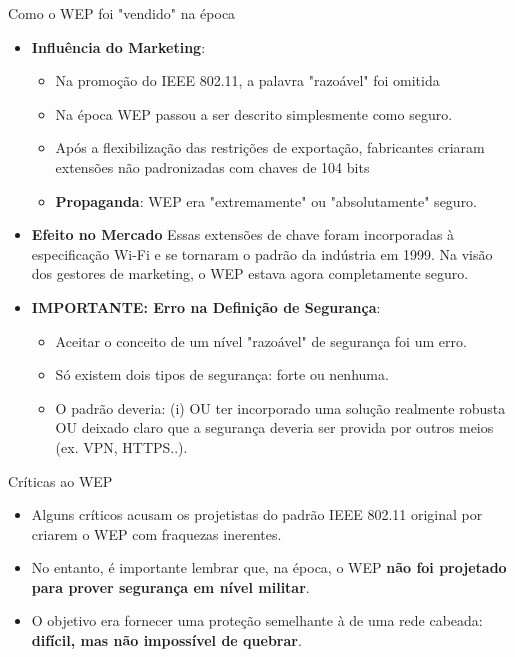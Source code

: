 \begin{frame}{Como o WEP foi "vendido" na época}
    \begin{itemize}
        \item \textbf{Influência do Marketing}:
              \begin{itemize}
                  \item Na promoção do IEEE 802.11, a palavra "razoável" foi omitida
                  \item Na época WEP passou a ser descrito simplesmente como seguro.
                  \item Após a flexibilização das restrições de exportação, fabricantes criaram extensões não padronizadas com chaves de 104 bits
                  \item \textbf{Propaganda}:  WEP era "extremamente" ou "absolutamente" seguro.
              \end{itemize}

        \item \textbf{Efeito no Mercado}
              Essas extensões de chave foram incorporadas à especificação Wi-Fi e se tornaram o padrão da indústria em 1999.
              Na visão dos gestores de marketing, o WEP estava agora completamente seguro.

        \item \textbf{IMPORTANTE: Erro na Definição de Segurança}:
              \begin{itemize}
                  \item Aceitar o conceito de um nível "razoável" de segurança foi um erro.
                  \item Só existem dois tipos de segurança: forte ou nenhuma.
                  \item O padrão deveria: (i) OU ter incorporado uma solução realmente robusta OU deixado claro que a segurança deveria ser provida por outros meios (ex. VPN, HTTPS..).
              \end{itemize}


    \end{itemize}
\end{frame}

\begin{frame}{Críticas ao WEP}
    \begin{itemize}
        \item Alguns críticos acusam os projetistas do padrão IEEE 802.11 original por criarem o WEP com fraquezas inerentes.
        \item No entanto, é importante lembrar que, na época, o WEP \textbf{não foi projetado para prover segurança em nível militar}.
        \item O objetivo era fornecer uma proteção semelhante à de uma rede cabeada: \textbf{difícil, mas não impossível de quebrar}.
    \end{itemize}
\end{frame}


